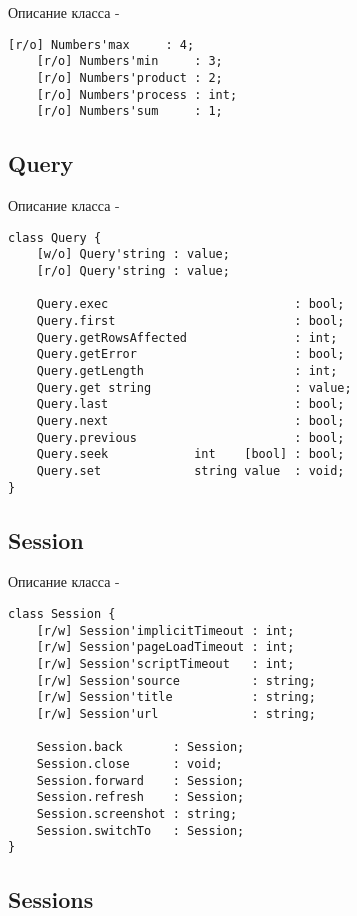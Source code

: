 \noindent Описание класса  -
\begin{lstlisting}[numbers=none]
    [r/o] Numbers'max     : 4;
	[r/o] Numbers'min     : 3;
	[r/o] Numbers'product : 2;
	[r/o] Numbers'process : int;
	[r/o] Numbers'sum     : 1;
\end{lstlisting}

\subsection{{\color{orange} Query}}

\noindent Описание класса  -
\begin{lstlisting}[numbers=none]
class Query {
    [w/o] Query'string : value;
	[r/o] Query'string : value;
	
    Query.exec                          : bool;
	Query.first                         : bool;
	Query.getRowsAffected               : int;
	Query.getError                      : bool;
	Query.getLength                     : int;
	Query.get string                    : value;
	Query.last                          : bool;
	Query.next                          : bool;
	Query.previous                      : bool;
	Query.seek            int    [bool] : bool;
	Query.set             string value  : void;
}
\end{lstlisting}

\subsection{{\color{orange} Session}}

\noindent Описание класса  -
\begin{lstlisting}[numbers=none]
class Session {
    [r/w] Session'implicitTimeout : int;
	[r/w] Session'pageLoadTimeout : int;
	[r/w] Session'scriptTimeout   : int;
	[r/w] Session'source          : string;
	[r/w] Session'title           : string;
	[r/w] Session'url             : string;
	
    Session.back       : Session;
	Session.close      : void;
	Session.forward    : Session;
	Session.refresh    : Session;
	Session.screenshot : string;
	Session.switchTo   : Session;
}
\end{lstlisting}

\subsection{{\color{orange} Sessions}}

